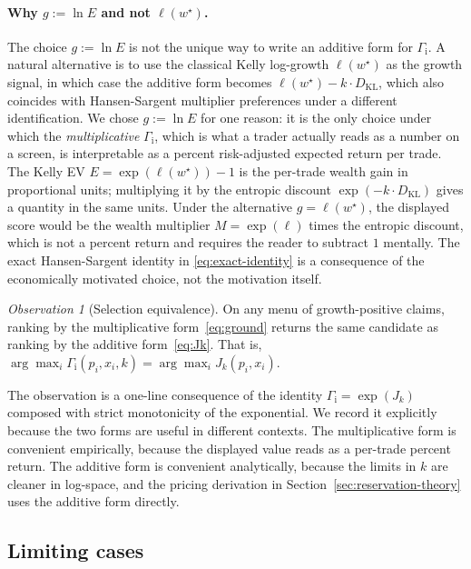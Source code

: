 \documentclass[11pt]{article}
\theoremstyle{definition}
\theoremstyle{remark}
\newtheorem{observation}[theorem]{Observation}
\newcommand{\KL}{D_{\mathrm{KL}}}
\newcommand{\GROUND}{\Gamma_{\mathrm{i}}}
\begin{document}
\paragraph{Why $g := \ln E$ and not $\ell(w^\star)$.}
The choice $g := \ln E$ is not the unique way to write an additive
form for $\GROUND$. A natural alternative is to use the classical
Kelly log-growth $\ell(w^\star)$ as the growth signal, in which
case the additive form becomes $\ell(w^\star) - k \cdot \KL$, which
also coincides with Hansen-Sargent multiplier preferences under a
different identification. We chose $g := \ln E$ for one reason: it
is the only choice under which the \emph{multiplicative}
$\GROUND$, which is what a trader actually reads as a number on a
screen, is interpretable as a percent risk-adjusted expected
return per trade. The Kelly EV $E = \exp(\ell(w^\star)) - 1$ is
the per-trade wealth gain in proportional units; multiplying it by
the entropic discount $\exp(-k \cdot \KL)$ gives a quantity in the
same units. Under the alternative $g = \ell(w^\star)$, the
displayed score would be the wealth multiplier $M = \exp(\ell)$
times the entropic discount, which is not a percent return and
requires the reader to subtract $1$ mentally. The exact
Hansen-Sargent identity in \eqref{eq:exact-identity} is a
consequence of the economically motivated choice, not the
motivation itself.

\begin{observation}[Selection equivalence]\label{obs:selection}
On any menu of growth-positive claims, ranking by the multiplicative
form~\eqref{eq:ground} returns the same candidate as ranking by the
additive form~\eqref{eq:Jk}. That is, $\arg\max_i \GROUND(p_i, x_i,
k) = \arg\max_i J_k(p_i, x_i)$.
\end{observation}

The observation is a one-line consequence of the identity
$\GROUND = \exp(J_k)$ composed with strict monotonicity of the
exponential. We record it explicitly because the two forms are
useful in different contexts. The multiplicative form is convenient
empirically, because the displayed value reads as a per-trade
percent return. The additive form is convenient analytically,
because the limits in $k$ are cleaner in log-space, and the pricing
derivation in Section~\ref{sec:reservation-theory} uses the additive form
directly.

\subsection{Limiting cases}\label{sec:limits}
\end{document}
